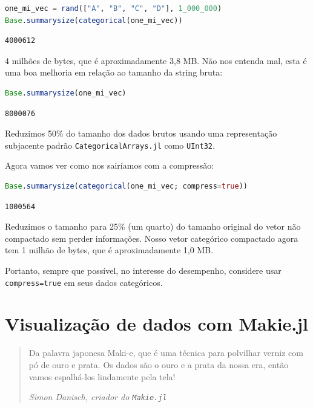 \documentclass[
  notoc %
]{tufte-book}
\newcommand{\passthrough}[1]{#1}
\begin{document}
\begin{lstlisting}[language=Julia]
one_mi_vec = rand(["A", "B", "C", "D"], 1_000_000)
Base.summarysize(categorical(one_mi_vec))
\end{lstlisting}

\begin{lstlisting}
4000612
\end{lstlisting}

4 milhões de bytes, que é aproximadamente 3,8 MB. Não nos entenda mal,
esta é uma boa melhoria em relação ao tamanho da string bruta:

\begin{lstlisting}[language=Julia]
Base.summarysize(one_mi_vec)
\end{lstlisting}

\begin{lstlisting}
8000076
\end{lstlisting}

Reduzimos 50\% do tamanho dos dados brutos usando uma representação
subjacente padrão \passthrough{\lstinline!CategoricalArrays.jl!} como
\passthrough{\lstinline!UInt32!}.

Agora vamos ver como nos sairíamos com a compressão:

\begin{lstlisting}[language=Julia]
Base.summarysize(categorical(one_mi_vec; compress=true))
\end{lstlisting}

\begin{lstlisting}
1000564
\end{lstlisting}

Reduzimos o tamanho para 25\% (um quarto) do tamanho original do vetor
não compactado sem perder informações. Nosso vetor categórico compactado
agora tem 1 milhão de bytes, que é aproximadamente 1,0 MB.

Portanto, sempre que possível, no interesse do desempenho, considere
usar \passthrough{\lstinline!compress=true!} em seus dados categóricos.

\hypertarget{sec:DataVisualizationMakie}{%
\chapter{Visualização de dados com
Makie.jl}\label{sec:DataVisualizationMakie}}

\begin{quote}
Da palavra japonesa Maki-e, que é uma técnica para polvilhar verniz com
pó de ouro e prata. Os dados são o ouro e a prata da nossa era, então
vamos espalhá-los lindamente pela tela!

\emph{Simon Danisch, criador do \passthrough{\lstinline!Makie.jl!}}
\end{quote}
\end{document}
